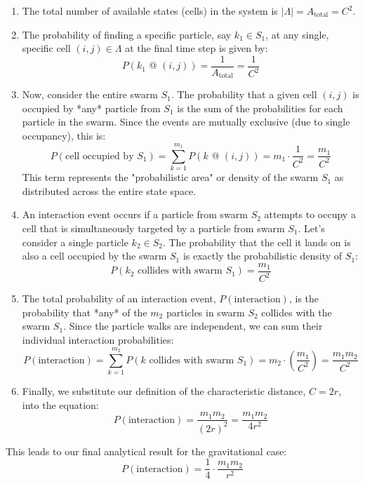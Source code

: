 \documentclass[11pt, letterpaper]{article}
\begin{document}
\begin{enumerate}
    \item The total number of available states (cells) in the system is $|\Lambda| = A_{\text{total}} = C^2$.

    \item The probability of finding a specific particle, say $k_1 \in S_1$, at any single, specific cell $(i,j) \in \Lambda$ at the final time step is given by:
    \[ P(k_1 \text{ @ } (i,j)) = \frac{1}{A_{\text{total}}} = \frac{1}{C^2} \]

    \item Now, consider the entire swarm $S_1$. The probability that a given cell $(i,j)$ is occupied by *any* particle from $S_1$ is the sum of the probabilities for each particle in the swarm. Since the events are mutually exclusive (due to single occupancy), this is:
    \[ P(\text{cell occupied by } S_1) = \sum_{k=1}^{m_1} P(k \text{ @ } (i,j)) = m_1 \cdot \frac{1}{C^2} = \frac{m_1}{C^2} \]
    This term represents the "probabilistic area" or density of the swarm $S_1$ as distributed across the entire state space.

    \item An interaction event occurs if a particle from swarm $S_2$ attempts to occupy a cell that is simultaneously targeted by a particle from swarm $S_1$. Let's consider a single particle $k_2 \in S_2$. The probability that the cell it lands on is also a cell occupied by the swarm $S_1$ is exactly the probabilistic density of $S_1$:
    \[ P(k_2 \text{ collides with swarm } S_1) = \frac{m_1}{C^2} \]

    \item The total probability of an interaction event, $P(\text{interaction})$, is the probability that *any* of the $m_2$ particles in swarm $S_2$ collides with the swarm $S_1$. Since the particle walks are independent, we can sum their individual interaction probabilities:
    \[ P(\text{interaction}) = \sum_{k=1}^{m_2} P(k \text{ collides with swarm } S_1) = m_2 \cdot \left( \frac{m_1}{C^2} \right) = \frac{m_1 m_2}{C^2} \]

    \item Finally, we substitute our definition of the characteristic distance, $C = 2r$, into the equation:
    \[ P(\text{interaction}) = \frac{m_1 m_2}{(2r)^2} = \frac{m_1 m_2}{4r^2} \]
\end{enumerate}

This leads to our final analytical result for the gravitational case:
\begin{equation} \label{eq:gravity}
P(\text{interaction}) = \frac{1}{4} \cdot \frac{m_1 m_2}{r^2}
\end{equation}
\end{document}
